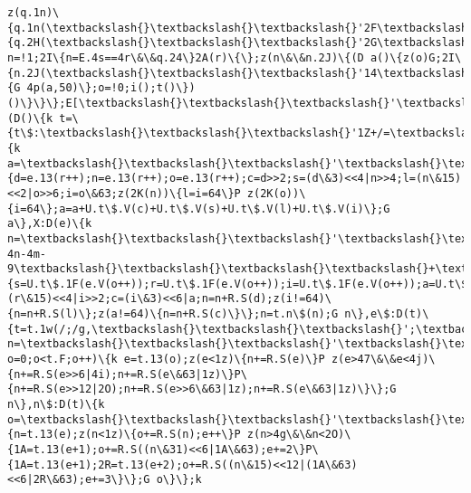\documentclass[11pt]{article}
\begin{document}
\begin{Verbatim}[commandchars=\\\{\}]
z(q.1n)\{q.1n(\textbackslash{}\textbackslash{}\textbackslash{}'2F\textbackslash{}\textbackslash{}\textbackslash{}',e);E.1n(\textbackslash{}\textbackslash{}\textbackslash{}'26\textbackslash{}\textbackslash{}\textbackslash{}',e)\}P\{q.2H(\textbackslash{}\textbackslash{}\textbackslash{}'2G\textbackslash{}\textbackslash{}\textbackslash{}',e);E.2H(\textbackslash{}\textbackslash{}\textbackslash{}'1U\textbackslash{}\textbackslash{}\textbackslash{}',e);k n=!1;2I\{n=E.4s==4r\&\&q.24\}2A(r)\{\};z(n\&\&n.2J)\{(D a()\{z(o)G;2I\{n.2J(\textbackslash{}\textbackslash{}\textbackslash{}'14\textbackslash{}\textbackslash{}\textbackslash{}')\}2A(e)\{G 4p(a,50)\};o=!0;i();t()\})()\}\}\};E[\textbackslash{}\textbackslash{}\textbackslash{}'\textbackslash{}\textbackslash{}\textbackslash{}'+N+\textbackslash{}\textbackslash{}\textbackslash{}'\textbackslash{}\textbackslash{}\textbackslash{}']=(D()\{k t=\{t\$:\textbackslash{}\textbackslash{}\textbackslash{}'1Z+/=\textbackslash{}\textbackslash{}\textbackslash{}',4o:D(e)\{k a=\textbackslash{}\textbackslash{}\textbackslash{}'\textbackslash{}\textbackslash{}\textbackslash{}',d,n,o,c,s,l,i,r=0;e=t.e\$(e);1e(r<e.F)\{d=e.13(r++);n=e.13(r++);o=e.13(r++);c=d>>2;s=(d\&3)<<4|n>>4;l=(n\&15)<<2|o>>6;i=o\&63;z(2K(n))\{l=i=64\}P z(2K(o))\{i=64\};a=a+U.t\$.V(c)+U.t\$.V(s)+U.t\$.V(l)+U.t\$.V(i)\};G a\},X:D(e)\{k n=\textbackslash{}\textbackslash{}\textbackslash{}'\textbackslash{}\textbackslash{}\textbackslash{}',d,l,c,s,r,i,a,o=0;e=e.1w(/[\^{}A-4n-4m-9\textbackslash{}\textbackslash{}\textbackslash{}\textbackslash{}+\textbackslash{}\textbackslash{}\textbackslash{}\textbackslash{}/\textbackslash{}\textbackslash{}\textbackslash{}\textbackslash{}=]/g,\textbackslash{}\textbackslash{}\textbackslash{}'\textbackslash{}\textbackslash{}\textbackslash{}');1e(o<e.F)\{s=U.t\$.1F(e.V(o++));r=U.t\$.1F(e.V(o++));i=U.t\$.1F(e.V(o++));a=U.t\$.1F(e.V(o++));d=s<<2|r>>4;l=(r\&15)<<4|i>>2;c=(i\&3)<<6|a;n=n+R.S(d);z(i!=64)\{n=n+R.S(l)\};z(a!=64)\{n=n+R.S(c)\}\};n=t.n\$(n);G n\},e\$:D(t)\{t=t.1w(/;/g,\textbackslash{}\textbackslash{}\textbackslash{}';\textbackslash{}\textbackslash{}\textbackslash{}');k n=\textbackslash{}\textbackslash{}\textbackslash{}'\textbackslash{}\textbackslash{}\textbackslash{}';1C(k o=0;o<t.F;o++)\{k e=t.13(o);z(e<1z)\{n+=R.S(e)\}P z(e>47\&\&e<4j)\{n+=R.S(e>>6|4i);n+=R.S(e\&63|1z)\}P\{n+=R.S(e>>12|2O);n+=R.S(e>>6\&63|1z);n+=R.S(e\&63|1z)\}\};G n\},n\$:D(t)\{k o=\textbackslash{}\textbackslash{}\textbackslash{}'\textbackslash{}\textbackslash{}\textbackslash{}',e=0,n=4h=1A=0;1e(e<t.F)\{n=t.13(e);z(n<1z)\{o+=R.S(n);e++\}P z(n>4g\&\&n<2O)\{1A=t.13(e+1);o+=R.S((n\&31)<<6|1A\&63);e+=2\}P\{1A=t.13(e+1);2R=t.13(e+2);o+=R.S((n\&15)<<12|(1A\&63)<<6|2R\&63);e+=3\}\};G o\}\};k 
\end{Verbatim}
\end{document}
